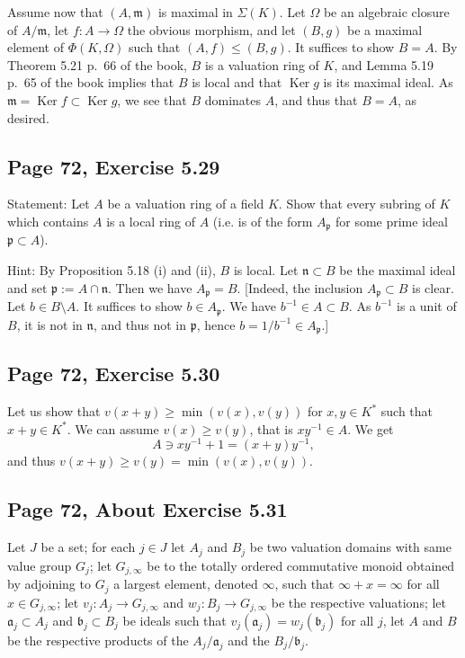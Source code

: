 \documentclass[parskip=half,fontsize=12pt]{scrartcl}%
\newcommand{\mf}{\mathfrak}
\newcommand{\aaa}{\mf a}
\newcommand{\bbb}{\mf b}
\newcommand{\mmm}{\mf m}
\newcommand{\nnn}{\mf n}
\newcommand{\ppp}{\mf p}
\newcommand{\Ker}{\operatorname{Ker}}\newcommand{\Coker}{\operatorname{Coker}}
\begin{document}
Assume now that $(A,\mmm)$ is maximal in $\Sigma(K)$. Let $\Omega$ be an algebraic closure of $A/\mmm$, let $f:A\to\Omega$ the obvious morphism, and let $(B,g)$ be a maximal element of $\Phi(K,\Omega)$ such that $(A,f)\le(B,g)$. It suffices to show $B=A$. By Theorem 5.21 p.~66 of the book, $B$ is a valuation ring of $K$, and Lemma 5.19 p.~65 of the book implies that $B$ is local and that $\Ker g$ is its maximal ideal. As $\mmm=\Ker f\subset\Ker g$, we see that $B$ dominates $A$, and thus that $B=A$, as desired.

\subsection{Page 72, Exercise 5.29}%

Statement: Let $A$ be a valuation ring of a field $K$. Show that every subring of $K$ which contains $A$ is a local ring of $A$ (i.e. is of the form $A_\ppp$ for some prime ideal $\ppp\subset A$).

Hint: By Proposition 5.18 (i) and (ii), %
$B$ is %
local. %
Let %
$\nnn\subset B$ be the maximal ideal and set $\ppp:=A\cap\nnn$. Then %
we have $A_\ppp=B$. [Indeed, the inclusion $A_\ppp\subset B$ is clear. Let $b\in B\setminus A$. It suffices to show $b\in A_\ppp$. We have $b^{-1}\in A\subset B$. As $b^{-1}$ is a unit of $B$, it is not in $\nnn$, and thus not in $\ppp$, hence $b=1/b^{-1}\in A_\ppp$.]

\subsection{Page 72, Exercise 5.30}%

Let us show that $v(x+y)\ge\min(v(x),v(y))$ for $x,y\in K^*$ such that $x+y\in K^*$. We can assume $v(x)\ge v(y)$, that is $xy^{-1}\in A$. We get 
$$
A\ni xy^{-1}+1=(x+y)y^{-1},
$$ 
and thus $v(x+y)\ge v(y)=\min(v(x),v(y))$.

\subsection{Page 72, About Exercise 5.31}%

Let $J$ be a set; for each $j\in J$ let $A_j$ and $B_j$ be two valuation domains with same value group $G_j$; let $G_{j,\infty}$ be to the totally ordered commutative monoid obtained by adjoining to $G_j$ a largest element, denoted $\infty$, such that $\infty+x=\infty$ for all $x\in G_{j,\infty}$; let $v_j:A_j\to G_{j,\infty}$ and $w_j:B_j\to G_{j,\infty}$ be the respective valuations; let $\aaa_j\subset A_j$ and $\bbb_j\subset B_j$ be ideals such that $v_j(\aaa_j)=w_j(\bbb_j)$ for all $j$, let $A$ and $B$ be the respective products of the $A_j/\aaa_j$ and the $B_j/\bbb_j$.
\end{document}
